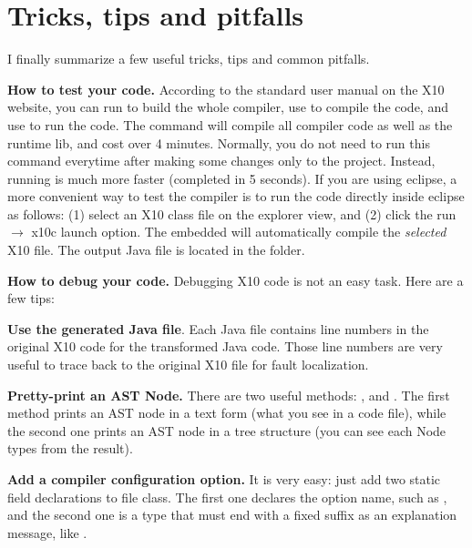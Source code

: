\documentclass{article}
\begin{document}
\section{Tricks, tips and pitfalls}
\label{sec:tips}

I finally summarize a few useful tricks, tips and common pitfalls.

\begin{enumerate}

\Item \textbf{How to test your code.} According to the standard user manual on the  X10 website, you can run  to build the whole compiler,  use  to compile the code, and use  to run the code.  The command  will compile all compiler code as well as the runtime lib, and cost over 4 minutes. Normally, you do not need to run this command everytime after making some changes only to the  project. Instead, running  is much more faster (completed in 5 seconds). If you are using eclipse, a more convenient way to test the compiler is to run the code directly inside eclipse as follows: (1) select an X10 class file on the explorer view, and (2) click the run $\rightarrow$ x10c launch option. The embedded  will automatically compile the \textit{selected} X10 file. The output Java file is located in the  folder. 

\Item \textbf{How to debug your code.} Debugging X10 code is not an easy task. Here are a few tips:

\begin{itemize}

\Item \textbf{Use the generated Java file}. Each Java file contains  line numbers in the original X10 code for the transformed Java code. Those line numbers are very useful to trace back to the original X10 file for fault localization.

\Item \textbf{Pretty-print an AST Node.} There are two useful methods: , and . The first method prints an AST node in a text form (what you see in a code file), while the second one prints an AST node in a tree structure (you can see each Node types from the result).

\end{itemize}


\Item \textbf{Add a compiler configuration option.} It is very easy: just add two static field declarations to file  class.  The first one declares the option name, such as , and the second one is a  type that must end with a fixed suffix  as an explanation message, like   .



\end{enumerate}
\end{document}
